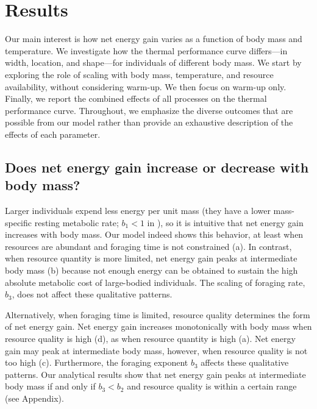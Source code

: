 \section*{Results}

Our main interest is how net energy gain varies as a function of body mass and temperature.
We investigate how the thermal performance curve differs---in width, location, and shape---for individuals of different body mass.
We start by exploring the role of scaling with body mass, temperature, and resource availability, without considering warm-up.
We then focus on warm-up only.
Finally, we report the combined effects of all processes on the thermal performance curve.
Throughout, we emphasize the diverse outcomes that are possible from our model rather than provide an exhaustive description of the effects of each parameter.


\subsection*{Does net energy gain increase or decrease with body mass?}

Larger individuals expend less energy per unit mass (they have a lower mass-specific resting metabolic rate; $b_1 < 1$ in ), so it is intuitive that net energy gain increases with body mass.
Our model indeed shows this behavior, at least when resources are abundant and foraging time is not constrained (a).
In contrast, when resource quantity is more limited, net energy gain peaks at intermediate body mass (b) because not enough energy can be obtained to sustain the high absolute metabolic cost of large-bodied individuals.
The scaling of foraging rate, $b_3$, does not affect these qualitative patterns.

Alternatively, when foraging time is limited, resource quality determines the form of net energy gain.
Net energy gain increases monotonically with body mass when resource quality is high (d), as when resource quantity is high (a).
Net energy gain may peak at intermediate body mass, however, when resource quality is not too high (c).
Furthermore, the foraging exponent $b_3$ affects these qualitative patterns.
Our analytical results show that net energy gain peaks at intermediate body mass if and only if $b_3 < b_2$ and resource quality is within a certain range (see Appendix).

